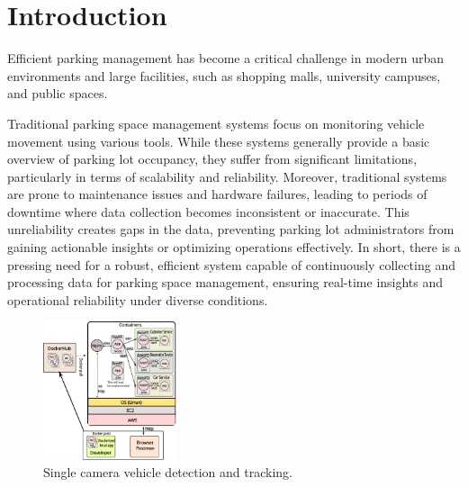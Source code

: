 \documentclass[5p,twocolumn,english]{elsarticle}
\begin{document}

\section{Introduction}
\label{sec_intro}

Efficient parking management has become a critical challenge in modern urban environments and large facilities, such as shopping malls, university campuses, and public spaces.

Traditional parking space management systems focus on monitoring vehicle movement using various tools. While these systems generally provide a basic overview of parking lot occupancy, they suffer from significant limitations, particularly in terms of scalability and reliability. Moreover, traditional systems are prone to maintenance issues and hardware failures, leading to periods of downtime where data collection becomes inconsistent or inaccurate. This unreliability creates gaps in the data, preventing parking lot administrators from gaining actionable insights or optimizing operations effectively. In short, there is a pressing need for a robust, efficient system capable of continuously collecting and processing data for parking space management, ensuring real-time insights and operational reliability under diverse conditions. 

  


  



\begin{figure}[t]
	\centering
	\includegraphics[width=0.35\textwidth]{figs/fig1.pdf}
	\caption{Single camera vehicle detection and tracking.}
	\label{fig1}
\end{figure}
\end{document}
